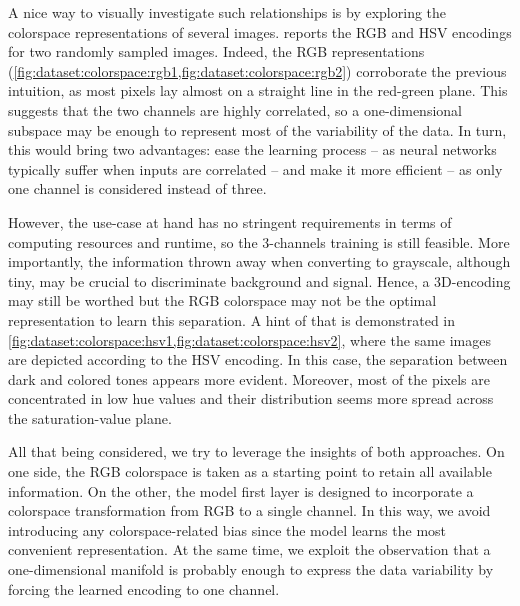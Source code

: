 A nice way to visually investigate such relationships is by exploring the colorspace representations of several images.
 reports the RGB and HSV encodings for two randomly sampled images.
Indeed, the RGB representations (\cref{fig:dataset:colorspace:rgb1,fig:dataset:colorspace:rgb2}) corroborate the previous intuition, as most pixels lay almost on a straight line in the red-green plane. 
This suggests that the two channels are highly correlated, so a one-dimensional subspace may be enough to represent most of the variability of the data.
In turn, this would bring two advantages: ease the learning process -- as neural networks typically suffer when inputs are correlated %
-- and make it more efficient -- as only one channel is considered instead of three.

However, the use-case at hand has no stringent requirements in terms of computing resources and runtime, so the 3-channels training is still feasible.
More importantly, the information thrown away when converting to grayscale, although tiny, may be crucial to discriminate background and signal. 
Hence, a 3D-encoding may still be worthed but the RGB colorspace may not be the optimal representation to learn this separation. A hint of that is demonstrated in \cref{fig:dataset:colorspace:hsv1,fig:dataset:colorspace:hsv2}, where the same images are depicted according to the HSV encoding. 
In this case, the separation between dark and colored tones appears more evident. 
Moreover, most of the pixels are concentrated in low hue values
and their distribution seems more spread across the saturation-value plane. 

All that being considered, we try to leverage the insights of both approaches. 
On one side, the RGB colorspace is taken as a starting point to retain all available information. On the other, the model first layer is designed to incorporate a colorspace transformation from RGB to a single channel.
In this way, we avoid introducing any colorspace-related bias since the model learns the most convenient representation.
At the same time, we exploit the observation that a one-dimensional manifold is probably enough to express the data variability by forcing the learned encoding to one channel.
    
